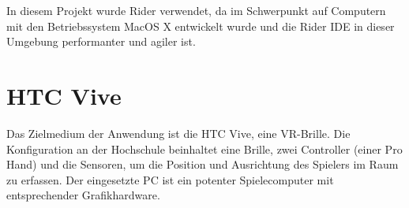 In diesem Projekt wurde Rider verwendet, da im Schwerpunkt auf Computern mit den Betriebssystem MacOS X entwickelt wurde und die Rider IDE in dieser Umgebung performanter und agiler ist.


\section{HTC Vive}
\label{Vive}
Das Zielmedium der Anwendung ist die HTC Vive, eine VR-Brille. Die Konfiguration an der Hochschule beinhaltet eine Brille, zwei Controller (einer Pro Hand) und die Sensoren, um die Position und Ausrichtung des Spielers im Raum zu erfassen. 
Der eingesetzte PC ist ein potenter Spielecomputer mit entsprechender Grafikhardware.

 